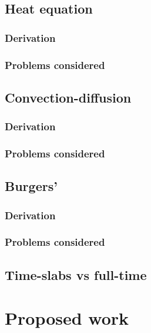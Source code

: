 \documentclass{report}
\begin{document}
\section{Heat equation}

\subsection{Derivation}

\subsection{Problems considered}


\section{Convection-diffusion}

\subsection{Derivation}

\subsection{Problems considered}


\section{Burgers'}

\subsection{Derivation}

\subsection{Problems considered}


\section{Time-slabs vs full-time}



\chapter{Proposed work}
\end{document}

